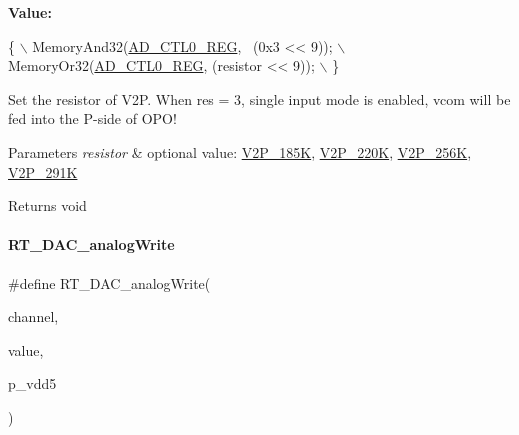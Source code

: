 {\bfseries Value\+:}
\begin{DoxyCode}
\{                                          \(\backslash\)
        MemoryAnd32(\mbox{\hyperlink{a00020_adadaa0ab1ebbd7ba9b70dfd24c3ed44da479497b755dee411ad6348cae2ef26b4}{AD\_CTL0\_REG}}, ~(0x3 << 9)); \(\backslash\)
        MemoryOr32(\mbox{\hyperlink{a00020_adadaa0ab1ebbd7ba9b70dfd24c3ed44da479497b755dee411ad6348cae2ef26b4}{AD\_CTL0\_REG}}, (resistor << 9));   \(\backslash\)
    \}
\end{DoxyCode}


Set the resistor of V2P. When res = 3, single input mode is enabled, vcom will be fed into the P-\/side of O\+P\+O! 


\begin{DoxyParams}{Parameters}
{\em resistor} & optional value\+: \mbox{\hyperlink{a00002_a80255c41c3764feff9b79664f15feb46aa035ba8725fe8565c5505a295c22ea8e}{V2\+P\+\_\+185K}}, \mbox{\hyperlink{a00002_a80255c41c3764feff9b79664f15feb46a1ac9774056594cac22ae2c6431fa4277}{V2\+P\+\_\+220K}}, \mbox{\hyperlink{a00002_a80255c41c3764feff9b79664f15feb46a4b7eb698a06cc149cbb1b7f8f4dd4a8e}{V2\+P\+\_\+256K}}, \mbox{\hyperlink{a00002_a80255c41c3764feff9b79664f15feb46ae20e5b8adb1fa31fa8df9a56d05e7eb5}{V2\+P\+\_\+291K}} \\
\hline
\end{DoxyParams}
\begin{DoxyReturn}{Returns}
void 
\end{DoxyReturn}
\mbox{\label{a00002_ab44c37130776b81ef554d8967fcf9e62}} 
\paragraph{\texorpdfstring{R\+T\+\_\+\+D\+A\+C\+\_\+analog\+Write}{RT\_DAC\_analogWrite}}
{\footnotesize\ttfamily \#define R\+T\+\_\+\+D\+A\+C\+\_\+analog\+Write(\begin{DoxyParamCaption}\item[{}]{channel,  }\item[{}]{value,  }\item[{}]{p\+\_\+vdd5 }\end{DoxyParamCaption})}


